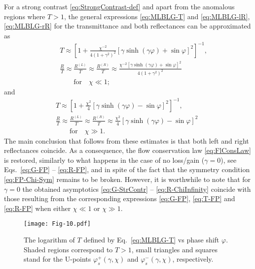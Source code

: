 \documentclass[aps,pra,reprint,showpacs,bibnotes,preprintnumbers,twoside,eqsecnum]{revtex4-1}
\begin{document}
For a strong contrast \eqref{eq:StrongContrast-def} and apart from the anomalous regions where $T>1$, the general expressions \eqref{eq:MLBLG-T} and \eqref{eq:MLBLG-lR}, \eqref{eq:MLBLG-rR} for the transmittance and both reflectances can be approximated as
%
\begin{eqnarray}
&&T\approx\left[1+\frac{\chi^{-2}}{4(1+\gamma^2)^2}\left[\gamma\sinh(\gamma\varphi)+\sin\varphi\right]^2\right]^{-1},\label{eq:T-ChiZero}\\
&&\frac{R}{T}\approx\frac{R^{(L)}}{T}\approx\frac{R^{(R)}}{T}\approx
\frac{\chi^{-2}\left[\gamma\sinh(\gamma\varphi)+\sin\varphi\right]^2}{4(1+\gamma^2)^2}\label{eq:R-ChiZero}\qquad\\
&&\qquad\mathrm{for}\quad\chi\ll1;\nonumber
\end{eqnarray}
and
%
\begin{eqnarray}
&&T\approx\left[1+\frac{\chi^2}{4}\left[\gamma\sinh(\gamma\varphi)-\sin\varphi\right]^2\right]^{-1},\label{eq:T-ChiInfinity}\\
&&\frac{R}{T}\approx\frac{R^{(L)}}{T}\approx\frac{R^{(R)}}{T}\approx\frac{\chi^2}{4}\left[\gamma\sinh(\gamma\varphi)-\sin\varphi\right]^2
\qquad\label{eq:R-ChiInfinity}\\
&&\qquad\mathrm{for}\quad\chi\gg1.\nonumber
\end{eqnarray}
The main conclusion that follows from these estimates is that both left and right reflectances coincide. As a consequence, the flow conservation law \eqref{eq:FlConsLaw} is restored, similarly to what happens in the case of no loss/gain ($\gamma=0$), see Eqs.~\eqref{eq:G-FP} -- \eqref{eq:R-FP}, and in spite of the fact that the symmetry condition \eqref{eq:FP-Chi-Sym} remains to be broken. However, it is worthwhile to note that for $\gamma=0$ the obtained asymptotics \eqref{eq:G-StrContr} -- \eqref{eq:R-ChiInfinity} coincide with those resulting from the corresponding expressions \eqref{eq:G-FP}, \eqref{eq:T-FP} and \eqref{eq:R-FP} when either $\chi\ll1$ or $\chi\gg1$.

\begin{figure}[!ht]
\texttt{[image: Fig-10.pdf]}
\caption{The logarithm of $T$ defined by Eq.~\eqref{eq:MLBLG-T} vs phase shift $\varphi$. Shaded regions correspond to $T>1$, small triangles and squares stand for the U-points $\varphi_s^{+}(\gamma,\chi)$ and $\varphi_s^{-}(\gamma,\chi)$, respectively.}\label{fig:Fig-10}
\end{figure}
\end{document}
